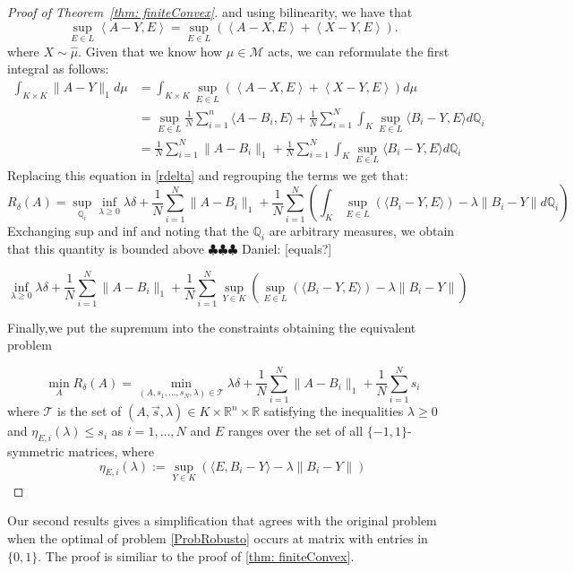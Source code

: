 \documentclass[12pt]{amsart}
\theoremstyle{remark}
\newcommand{\RR}{\mathbb{R}}
\newcommand{\ddr}[1]{{\color{blue} \sf $\clubsuit\clubsuit\clubsuit$ Daniel: [#1]}}
\begin{document}
\begin{proof}[Proof of Theorem~\ref{thm: finiteConvex}]
and using bilinearity, we have that 
\[
\sup_{E \in L} \left \langle A-Y,E\right \rangle = \sup_{E \in L} \left ( \left \langle A-X,E\right \rangle +  \left \langle X-Y,E\right \rangle \right ).
\]
where $X \sim \hat{\mu}$.
Given that we know how $\mu \in \mathcal{M}$ acts, we can reformulate  the first integral as follows:
\[
\begin{aligned}
\int_{K \times K} \|A-Y\|_1 d\mu &= \int_{K \times K} \sup_{E \in L} \left ( \left \langle A-X,E\right \rangle +  \left \langle X-Y,E\right \rangle \right ) d\mu \\
& = \sup_{E \in L} \frac{1}{N} \sum_{i=1}^n   \langle A-B_i,E  \rangle +\frac{1}{N}\sum_{i=1}^N \int_K \sup_{E \in L} \langle B_i-Y,E\rangle d \mathbb{Q}_i \\
& = \frac{1}{N} \sum_{i=1}^N \|A-B_i\|_1 +\frac{1}{N}\sum_{i=1}^N \int_K \sup_{E \in L} \langle B_i-Y,E\rangle d \mathbb{Q}_i 
\end{aligned}
\]
Replacing this equation in \ref{rdelta} and regrouping the terms we get that:
\[
R_{\delta}(A) = \sup_{\mathbb{Q}_i} \inf_{\lambda \geq 0} \lambda \delta + \frac{1}{N} \sum_{i=1}^N \|A-B_i\|_1  +\frac{1}{N}\sum_{i=1}^N \left ( \int_K \sup_{E \in L}(\langle B_i-Y,E \rangle) -\lambda \|B_i-Y\|   d \mathbb{Q}_i   \right )
\]
Exchanging sup and inf and noting that the $\mathbb{Q}_i$ are arbitrary measures, we 
obtain that this quantity is bounded above \ddr{equals?}

\[
\inf_{\lambda \geq 0} \lambda \delta + \frac{1}{N} \sum_{i=1}^N \|A-B_i\|_1  +\frac{1}{N}\sum_{i=1}^N \sup_{Y \in K} \left ( \sup_{E \in L}(\langle B_i-Y,E \rangle) -\lambda \|B_i-Y\|   \right )
\]

Finally,we put the supremum into the constraints obtaining the equivalent problem

\[ \min_{A} R_{\delta}(A)=\min_{(A,s_1,\dots, s_N,\lambda)\in \mathcal{T}} \lambda \delta + \frac{1}{N} \sum_{i=1}^N \|A-B_i\|_1  +\frac{1}{N}\sum_{i=1}^N s_i
\]
where $\mathcal{T}$ is the set of $(A,\vec{s},\lambda)\in K\times \RR^n\times \RR$  satisfying the inequalities $\lambda\geq 0$ and $\eta_{E, i}(\lambda)\leq s_i$ as $i=1,\dots, N$ and $E$ ranges over the set of all $\{-1,1\}$-symmetric matrices, where
\[\eta_{E, i}(\lambda):= \sup_{Y\in K} \left(\langle E, B_i-Y\rangle -\lambda \|B_i-Y\|\right)\]
\end{proof}

Our second results gives a simplification that agrees with the original problem when the optimal of problem \ref{ProbRobusto} occurs at matrix with entries in $\{0,1\}$.
The proof is similiar to the proof of \ref{thm: finiteConvex}.
\end{document}
